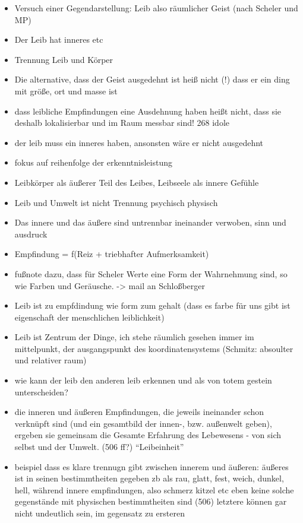 \documentclass[a4paper, 12pt]{article}
\begin{document}
\begin{onehalfspace}

\begin{itemize}
  \item Versuch einer Gegendarstellung: Leib also räumlicher Geist (nach Scheler und MP)
  \item Der Leib hat inneres etc
  \item Trennung Leib und Körper
  \item Die alternative, dass der Geist ausgedehnt ist heiß nicht (!) dass er ein ding mit größe, ort und masse ist
  \item dass leibliche Empfindungen eine Ausdehnung haben heißt nicht, dass sie deshalb lokalisierbar und im Raum messbar sind! 268 idole
  \item der leib muss ein inneres haben, ansonsten wäre er nicht ausgedehnt
  \item fokus auf reihenfolge der erkenntnisleistung
  \item Leibkörper als äußerer Teil des Leibes, Leibseele als innere Gefühle
  \item Leib und Umwelt ist nicht Trennung psychisch physisch
  \item Das innere und das äußere sind untrennbar ineinander verwoben, sinn und ausdruck 
  \item Empfindung = f(Reiz + triebhafter Aufmerksamkeit)
  \item fußnote dazu, dass für Scheler Werte eine Form der Wahrnehmung sind, so wie Farben und Geräusche. -> mail an Schloßberger
  \item Leib ist zu empfdindung wie form zum gehalt (dass es farbe für uns gibt ist eigenschaft der menschlichen leiblichkeit)
  \item Leib ist Zentrum der Dinge, ich stehe räumlich gesehen immer im mittelpunkt, der ausgangspunkt des koordinatensystems (Schmitz: absoulter und relativer raum)
  \item wie kann der leib den anderen leib erkennen und als von totem gestein unterscheiden?
  \item die inneren und äußeren Empfindungen, die jeweils ineinander schon verknüpft sind (und ein gesamtbild der innen-, bzw. außenwelt geben), ergeben sie gemeinsam die Gesamte Erfahrung des Lebewesens - von sich selbst und der Umwelt. (506 ff?) "`Leibeinheit"'
  \item beispiel dass es klare trennugn gibt zwischen innerem und äußeren: äußeres ist in seinen bestimmtheiten gegeben zb als rau, glatt, fest, weich, dunkel, hell, während innere empfindungen, also schmerz kitzel etc eben keine solche gegenstände mit physischen bestimmtheiten sind (506) letztere können gar nicht undeutlich sein, im gegensatz zu ersteren

\end{itemize}
\end{onehalfspace}
\end{document}
